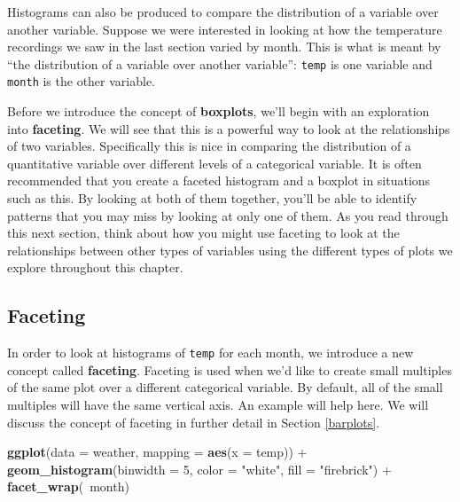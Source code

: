 \documentclass[]{tufte-book}
\newenvironment{Shaded}{\begin{snugshade}}{\end{snugshade}}
\newcommand{\KeywordTok}[1]{\textcolor[rgb]{0.13,0.29,0.53}{\textbf{{#1}}}}
\newcommand{\DataTypeTok}[1]{\textcolor[rgb]{0.13,0.29,0.53}{{#1}}}
\newcommand{\DecValTok}[1]{\textcolor[rgb]{0.00,0.00,0.81}{{#1}}}
\newcommand{\StringTok}[1]{\textcolor[rgb]{0.31,0.60,0.02}{{#1}}}
\newcommand{\NormalTok}[1]{{#1}}
\begin{document}
Histograms can also be produced to compare the distribution of a
variable over another variable. Suppose we were interested in looking at
how the temperature recordings we saw in the last section varied by
month. This is what is meant by ``the distribution of a variable over
another variable'': \texttt{temp} is one variable and \texttt{month} is
the other variable.

Before we introduce the concept of \textbf{boxplots}, we'll begin with
an exploration into \textbf{faceting}. We will see that this is a
powerful way to look at the relationships of two variables. Specifically
this is nice in comparing the distribution of a quantitative variable
over different levels of a categorical variable. It is often recommended
that you create a faceted histogram and a boxplot in situations such as
this. By looking at both of them together, you'll be able to identify
patterns that you may miss by looking at only one of them. As you read
through this next section, think about how you might use faceting to
look at the relationships between other types of variables using the
different types of plots we explore throughout this chapter.

\subsection{Faceting}\label{faceting}

In order to look at histograms of \texttt{temp} for each month, we
introduce a new concept called \textbf{faceting}. Faceting is used when
we'd like to create small multiples of the same plot over a different
categorical variable. By default, all of the small multiples will have
the same vertical axis. An example will help here. We will discuss the
concept of faceting in further detail in Section \ref{barplots}.

\newpage

\begin{Shaded}
\begin{Highlighting}[]
\KeywordTok{ggplot}\NormalTok{(}\DataTypeTok{data =} \NormalTok{weather, }\DataTypeTok{mapping =} \KeywordTok{aes}\NormalTok{(}\DataTypeTok{x =} \NormalTok{temp)) +}
\StringTok{  }\KeywordTok{geom_histogram}\NormalTok{(}\DataTypeTok{binwidth =} \DecValTok{5}\NormalTok{, }\DataTypeTok{color =} \StringTok{"white"}\NormalTok{, }\DataTypeTok{fill =} \StringTok{"firebrick"}\NormalTok{) +}
\StringTok{  }\KeywordTok{facet_wrap}\NormalTok{(~month)}
\end{Highlighting}
\end{Shaded}
\end{document}
